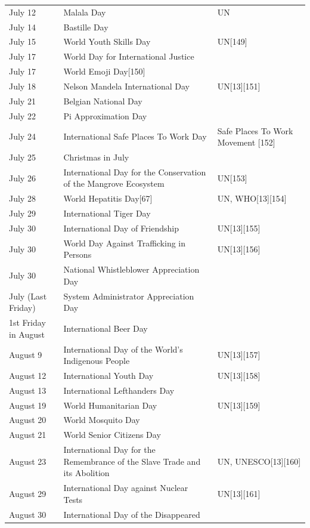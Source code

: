 \documentclass[
]{book}
\begin{document}
\begin{longtable}[t]{>{\raggedright\arraybackslash}p{8em}>{\raggedright\arraybackslash}p{20em}>{\raggedright\arraybackslash}p{12em}}
July 12 & Malala Day & UN\\
July 14 & Bastille Day & \\
\addlinespace
July 15 & World Youth Skills Day & UN[149]\\
July 17 & World Day for International Justice & \\
July 17 & World Emoji Day[150] & \\
July 18 & Nelson Mandela International Day & UN[13][151]\\
July 21 & Belgian National Day & \\
\addlinespace
July 22 & Pi Approximation Day & \\
July 24 & International Safe Places To Work Day & Safe Places To Work Movement [152]\\
July 25 & Christmas in July & \\
July 26 & International Day for the Conservation of the Mangrove Ecosystem & UN[153]\\
July 28 & World Hepatitis Day[67] & UN, WHO[13][154]\\
\addlinespace
July 29 & International Tiger Day & \\
July 30 & International Day of Friendship & UN[13][155]\\
July 30 & World Day Against Trafficking in Persons & UN[13][156]\\
July 30 & National Whistleblower Appreciation Day & \\
July (Last Friday) & System Administrator Appreciation Day & \\
\addlinespace
1st Friday in August & International Beer Day & \\
August 9 & International Day of the World's Indigenous People & UN[13][157]\\
August 12 & International Youth Day & UN[13][158]\\
August 13 & International Lefthanders Day & \\
August 19 & World Humanitarian Day & UN[13][159]\\
\addlinespace
August 20 & World Mosquito Day & \\
August 21 & World Senior Citizens Day & \\
August 23 & International Day for the Remembrance of the Slave Trade and its Abolition & UN, UNESCO[13][160]\\
August 29 & International Day against Nuclear Tests & UN[13][161]\\
August 30 & International Day of the Disappeared & \\

\end{longtable}
\end{document}
